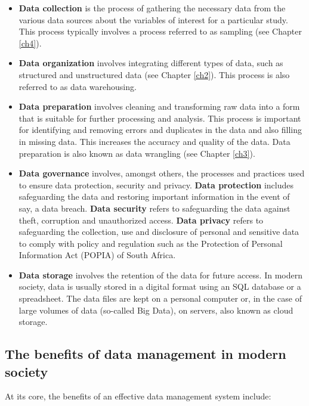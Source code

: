 \documentclass[
]{book}
\begin{document}
\begin{itemize}
\item
  \textbf{Data collection} is the process of gathering the necessary data from the various data sources about the variables of interest for a particular study. This process typically involves a process referred to as sampling (see Chapter \ref{ch4}).
\item
  \textbf{Data organization} involves integrating different types of data, such as structured and unstructured data (see Chapter \ref{ch2}). This process is also referred to as data warehousing.
\item
  \textbf{Data preparation} involves cleaning and transforming raw data into a form that is suitable for further processing and analysis. This process is important for identifying and removing errors and duplicates in the data and also filling in missing data. This increases the accuracy and quality of the data. Data preparation is also known as data wrangling (see Chapter \ref{ch3}).
\item
  \textbf{Data governance} involves, amongst others, the processes and practices used to ensure data protection, security and privacy. \textbf{Data protection} includes safeguarding the data and restoring important information in the event of say, a data breach. \textbf{Data security} refers to safeguarding the data against theft, corruption and unauthorized access. \textbf{Data privacy} refers to safeguarding the collection, use and disclosure of personal and sensitive data to comply with policy and regulation such as the Protection of Personal Information Act (POPIA) of South Africa.
\item
  \textbf{Data storage} involves the retention of the data for future access. In modern society, data is usually stored in a digital format using an SQL database or a spreadsheet. The data files are kept on a personal computer or, in the case of large volumes of data (so-called Big Data), on servers, also known as cloud storage.
\end{itemize}

\subsection{The benefits of data management in modern society}\label{the-benefits-of-data-management-in-modern-society}

At its core, the benefits of an effective data management system include:
\end{document}

